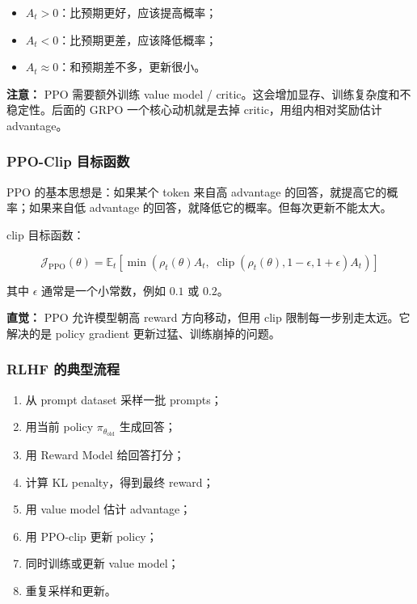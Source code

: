 \begin{itemize}[leftmargin=1.5em]
  \item $A_t > 0$：比预期更好，应该提高概率；
  \item $A_t < 0$：比预期更差，应该降低概率；
  \item $A_t \approx 0$：和预期差不多，更新很小。
\end{itemize}

\begin{warnbox}
\textbf{注意：} PPO 需要额外训练 value model / critic。这会增加显存、训练复杂度和不稳定性。后面的 GRPO 一个核心动机就是去掉 critic，用组内相对奖励估计 advantage。
\end{warnbox}

\subsubsection{PPO-Clip 目标函数}

PPO 的基本思想是：如果某个 token 来自高 advantage 的回答，就提高它的概率；如果来自低 advantage 的回答，就降低它的概率。但每次更新不能太大。

clip 目标函数：

\[
\mathcal{J}_\text{PPO}(\theta)
=
\mathbb{E}_t
\left[
\min
\left(
\rho_t(\theta) A_t,\;
\operatorname{clip}(\rho_t(\theta), 1-\epsilon, 1+\epsilon) A_t
\right)
\right]
\]

其中 $\epsilon$ 通常是一个小常数，例如 $0.1$ 或 $0.2$。

\begin{intubox}
\textbf{直觉：} PPO 允许模型朝高 reward 方向移动，但用 clip 限制每一步别走太远。它解决的是 policy gradient 更新过猛、训练崩掉的问题。
\end{intubox}

\subsubsection{RLHF 的典型流程}

\begin{enumerate}[leftmargin=1.5em]
  \item 从 prompt dataset 采样一批 prompts；
  \item 用当前 policy $\pi_{\theta_\text{old}}$ 生成回答；
  \item 用 Reward Model 给回答打分；
  \item 计算 KL penalty，得到最终 reward；
  \item 用 value model 估计 advantage；
  \item 用 PPO-clip 更新 policy；
  \item 同时训练或更新 value model；
  \item 重复采样和更新。
\end{enumerate}

